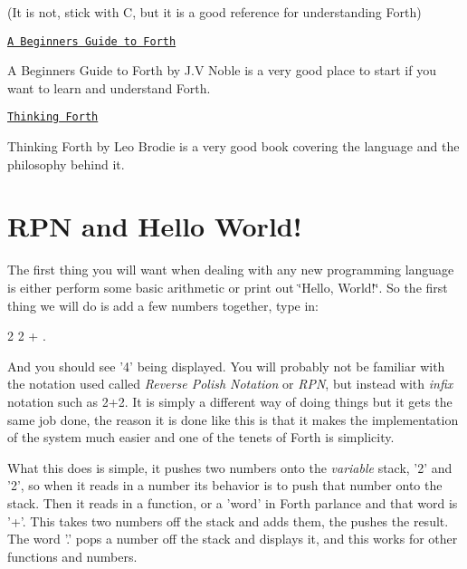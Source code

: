 (It is not, stick with C, but it is a good reference for understanding Forth)


\begin{DoxyItemize}
\item \href{http://galileo.phys.virginia.edu/classes/551.jvn.fall01/primer.htm}{\tt A Beginners Guide to Forth}
\end{DoxyItemize}

A Beginners Guide to Forth by J.\-V Noble is a very good place to start if you want to learn and understand Forth.


\begin{DoxyItemize}
\item \href{http://thinking-forth.sourceforge.net/}{\tt Thinking Forth}
\end{DoxyItemize}

Thinking Forth by Leo Brodie is a very good book covering the language and the philosophy behind it.

\section*{R\-P\-N and Hello World!}

The first thing you will want when dealing with any new programming language is either perform some basic arithmetic or print out \char`\"{}\-Hello, World!\char`\"{}. So the first thing we will do is add a few numbers together, type in\-:

\begin{DoxyVerb}2 2 + .\end{DoxyVerb}


And you should see '4' being displayed. You will probably not be familiar with the notation used called {\itshape Reverse Polish Notation} or {\itshape R\-P\-N}, but instead with {\itshape infix} notation such as 2+2. It is simply a different way of doing things but it gets the same job done, the reason it is done like this is that it makes the implementation of the system much easier and one of the tenets of Forth is simplicity.

What this does is simple, it pushes two numbers onto the {\itshape variable} stack, '2' and '2', so when it reads in a number its behavior is to push that number onto the stack. Then it reads in a function, or a 'word' in Forth parlance and that word is '+'. This takes two numbers off the stack and adds them, the pushes the result. The word '.' pops a number off the stack and displays it, and this works for other functions and numbers.

